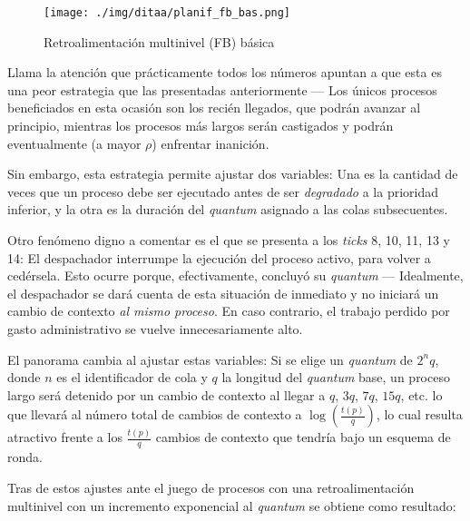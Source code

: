 \documentclass[11pt,fleqn]{book} %
\begin{document}
\begin{figure}[htb]
\centering
\texttt{[image: ./img/ditaa/planif\_fb\_bas.png]}
\caption{\label{PLAN_planif_fb_bas}Retroalimentación multinivel (FB) básica}
\end{figure}

Llama la atención que prácticamente todos los números apuntan a que
esta es una peor estrategia que las presentadas anteriormente — Los
únicos procesos beneficiados en esta ocasión son los recién llegados,
que podrán avanzar al principio, mientras los procesos más largos
serán castigados y podrán eventualmente (a mayor $\rho$) enfrentar
inanición.

Sin embargo, esta estrategia permite ajustar dos variables: Una es
la cantidad de veces que un proceso debe ser ejecutado antes de ser
\emph{degradado} a la prioridad inferior, y la otra es la duración del
\emph{quantum} asignado a las colas subsecuentes.

Otro fenómeno digno a comentar es el que se presenta a los \emph{ticks} 8,
10, 11, 13 y 14:
El despachador interrumpe la ejecución del proceso activo, para volver
a cedérsela. Esto ocurre porque, efectivamente, concluyó su \emph{quantum}
— Idealmente, el despachador se dará cuenta de esta situación de
inmediato y no iniciará un cambio de contexto \emph{al mismo proceso}. En
caso contrario, el trabajo perdido por gasto administrativo se vuelve
innecesariamente alto.

El panorama cambia al ajustar estas variables: Si se elige un
\emph{quantum} de $2^nq$, donde $n$ es el identificador de cola y $q$ la
longitud del \emph{quantum} base, un proceso largo será detenido por un
cambio de contexto al llegar a $q$, $3q$, $7q$, $15q$, etc. lo que
llevará al número total de cambios de contexto a
$\log(\frac{t(p)}{q})$, lo cual resulta atractivo frente a los
$\frac{t(p)}{q}$ cambios de contexto que tendría bajo un esquema de
ronda.

Tras de estos ajustes ante el juego de procesos con una
retroalimentación multinivel con un incremento exponencial al
\emph{quantum} se obtiene como resultado:
\end{document}
